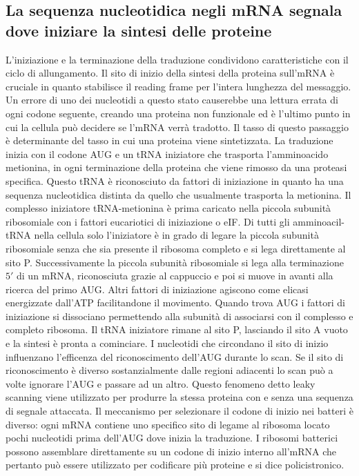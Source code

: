 \subsection{La sequenza nucleotidica negli mRNA segnala dove iniziare la sintesi delle proteine}
L'iniziazione e la terminazione della traduzione condividono caratteristiche con il ciclo di allungamento. Il sito di inizio della sintesi della proteina sull'mRNA \`e cruciale in quanto
stabilisce il reading frame per l'intera lunghezza del messaggio. Un errore di uno dei nucleotidi a questo stato causerebbe una lettura errata di ogni codone seguente, creando una 
proteina non funzionale ed \`e l'ultimo punto in cui la cellula pu\`o decidere se l'mRNA verr\`a tradotto. Il tasso di questo passaggio \`e determinante del tasso in cui una proteina 
viene sintetizzata. La traduzione inizia con il codone AUG e un tRNA iniziatore che trasporta l'amminoacido metionina, in ogni terminazione  della proteina che viene rimosso
da una proteasi specifica. Questo tRNA \`e riconosciuto da fattori di iniziazione in quanto ha una sequenza nucleotidica distinta da quello che usualmente trasporta la metionina. Il
complesso iniziatore tRNA-metionina \`e prima caricato nella piccola subunit\`a ribosomiale con i fattori eucariotici di iniziazione o eIF. Di tutti gli amminoacil-tRNA nella cellula 
solo l'iniziatore \`e in grado di legare la piccola subunit\`a ribosomiale senza che sia presente il ribosoma completo e si lega direttamente al sito P. Successivamente la piccola 
subunit\`a ribosomiale si lega alla terminazione $5'$ di un mRNA, riconosciuta grazie al cappuccio e poi si muove in avanti alla ricerca del primo AUG. Altri fattori di iniziazione 
agiscono come elicasi energizzate dall'ATP facilitandone il movimento. Quando trova AUG i fattori di iniziazione si dissociano permettendo alla subunit\`a di associarsi con il
complesso e completo ribosoma. Il tRNA iniziatore rimane al sito P, lasciando il sito A vuoto e la sintesi \`e pronta a cominciare. I nucleotidi che circondano il sito di inizio 
influenzano l'efficenza del riconoscimento dell'AUG durante lo scan. Se il sito di riconoscimento \`e diverso sostanzialmente dalle regioni adiacenti lo scan pu\`o a volte ignorare l'AUG
e passare ad un altro. Questo fenomeno detto leaky scanning viene utilizzato per produrre la stessa proteina con e senza una sequenza di segnale attaccata. Il meccanismo per selezionare 
il codone di inizio nei batteri \`e diverso: ogni mRNA contiene uno specifico sito di legame al ribosoma locato pochi nucleotidi prima dell'AUG dove inizia la traduzione. I ribosomi 
batterici possono assemblare direttamente su un codone di inizio interno all'mRNA che pertanto pu\`o essere utilizzato per codificare pi\`u proteine e si dice policistronico. 
